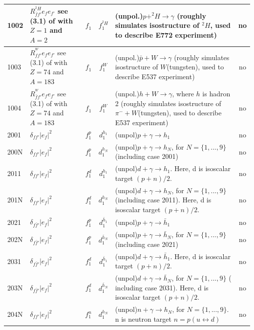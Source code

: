 \documentclass[prd,nofootinbib,eqsecnum,final]{revtex4}
\newcommand{\Ds}{\displaystyle}
\renewcommand{\(}{\left(}
\renewcommand{\)}{\right)}
\renewcommand{\[}{\left[}
\renewcommand{\]}{\right]}
\begin{document}
\begin{center}
\begin{longtable}{||l|p{6cm}|c|c||p{7cm}|c||}
\\\hline
1002 & $\Ds R^{^2H}_{\bar f f'}e_f e_{f'} $ see (3.1) of \cite{Scimemi:2017etj} with $Z=1$ and $A=2$ & $f_1$ & $f^{^2H}_1$ & (unpol.)$p+^2H\to \gamma$ (roughly simulates isostructure of $^2H$, used to describe E772 experiment)& no
\\\hline
1003 & $\Ds R^{^W}_{f f'}e_f e_{f'} $ see (3.1) of \cite{Scimemi:2017etj} with $Z=74$ and $A=183$ & $f_1$ & $f^{W}_1$ & (unpol.)$\bar p+W\to \gamma$ (roughly simulates isostructure of $W$(tungsten), used to describe E537 experiment)& no
\\\hline
1004 & $\Ds R^{^W}_{\bar f f'}e_f e_{f'} $ see (3.1) of \cite{Scimemi:2017etj} with $Z=74$ and $A=183$ & $f_1$ & $f^{W}_1$ & (unpol.)$h+W\to \gamma$, where $h$ is hadron 2 (roughly simulates isostructure of $\pi^-+W$(tungsten), used to describe E537 experiment)& no
\\\hline \hline
2001 & $\delta_{ff'}|e_f|^2$~~&$f^p_1$ & $d^{h_1}_1$ & (unpol)$p+\gamma\to h_1$ & no
\\\hline
200N & $\delta_{ff'}|e_f|^2$~~&$f^p_1$ & $d^{h_N}_1$ & (unpol)$p+\gamma\to h_N$, for $N=\{1,...,9\}$ (including case 2001) & no
\\\hline \hline
2011 & $\delta_{ff'}|e_f|^2$~~&$f^{d}_1$ & $d^{h_1}_1$ & (unpol)$d+\gamma\to h_1$. Here, d is isoscalar target $(p+n)/2$. & no
\\\hline
201N & $\delta_{ff'}|e_f|^2$~~&$f^{d}_1$ & $d^{h_N}_1$ & (unpol)$d+\gamma\to h_N$, for $N=\{1,...,9\}$ (including case 2011). Here, d is isoscalar target $(p+n)/2$. & no
\\\hline \hline
2021 & $\delta_{f\bar f'}|e_f|^2$~~&$f^p_1$ & $d^{\bar h_1}_1$ & (unpol)$p+\gamma\to \bar h_1$ & no
\\\hline
202N & $\delta_{f\bar f'}|e_f|^2$~~&$f^p_1$ & $d^{\bar h_N}_1$ & (unpol)$p+\gamma\to \bar h_N$, for $N=\{1,...,9\}$ (including case 2021) & no
\\\hline \hline
2031 & $\delta_{f\bar f'}|e_f|^2$~~&$f^{d}_1$ & $d^{\bar h_1}_1$ & (unpol)$d+\gamma\to \bar h_1$. Here, d is isoscalar target $(p+n)/2$. & no
\\\hline
203N & $\delta_{f\bar f'}|e_f|^2$~~&$f^{d}_1$ & $d^{\bar h_N}_1$ & (unpol)$d+\gamma\to \bar h_N$, for $N=\{1,...,9\}$ ( including case 2031). Here, d is isoscalar target $(p+n)/2$. & no
\\\hline \hline
204N & $\delta_{ff'}|e_f|^2$~~&$f^n_1$ & $d^{h_N}_1$ & (unpol)$n+\gamma\to h_N$, for $N=\{1,...,9\}$. n is neutron target $n=p(u\leftrightarrow d)$ & no
\\\hline

\end{longtable}
\end{center}
\end{document}
